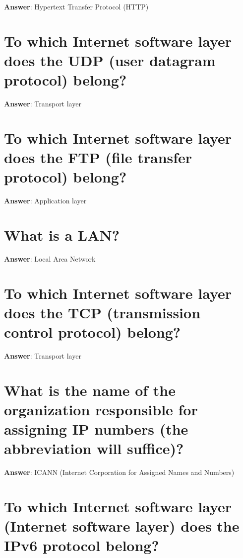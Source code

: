 \documentclass[a4paper,11pt,oneside]{book}
\begin{document}
\begin{sloppypar}
\label{q:18:sa:en:True}

\textbf{Answer}: Hypertext Transfer Protocol (HTTP)



\section{To which Internet software layer does the UDP (user datagram protocol) belong?}

\label{q:19:sa:en:True}

\textbf{Answer}: Transport layer



\section{To which Internet software layer does the FTP (file transfer protocol) belong?}

\label{q:20:sa:en:True}

\textbf{Answer}: Application layer



\section{What is a LAN?}

\label{q:21:sa:en:True}

\textbf{Answer}: Local Area Network



\section{To which Internet software layer does the TCP (transmission control protocol) belong?}

\label{q:22:sa:en:True}

\textbf{Answer}: Transport layer



\section{What is the name of the organization responsible for assigning IP numbers (the abbreviation will suffice)?}

\label{q:23:sa:en:True}

\textbf{Answer}: ICANN (Internet Corporation for Assigned Names and Numbers)



\section{To which Internet software layer (Internet software layer) does the IPv6 protocol belong?}


\end{sloppypar}
\end{document}
